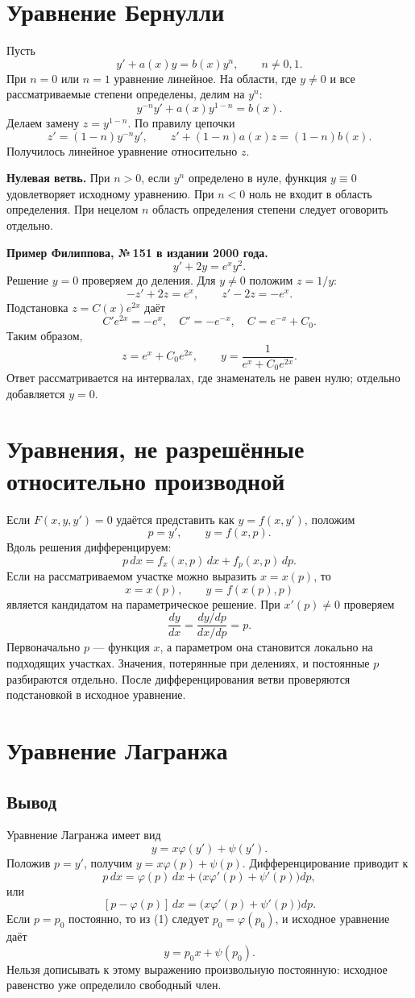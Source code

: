 \documentclass[12pt,a4paper]{article}
\begin{document}
\section{Уравнение Бернулли}
Пусть
\[
y'+a(x)y=b(x)y^n,\qquad n\ne0,1.
\]
При $n=0$ или $n=1$ уравнение линейное. На области, где $y\ne0$ и все рассматриваемые степени определены, делим на $y^n$:
\[
y^{-n}y'+a(x)y^{1-n}=b(x).
\]
Делаем замену $z=y^{1-n}$. По правилу цепочки
\[
z'=(1-n)y^{-n}y',\qquad
\boxed{z'+(1-n)a(x)z=(1-n)b(x).}
\]
Получилось линейное уравнение относительно $z$.

\textbf{Нулевая ветвь.} При $n>0$, если $y^n$ определено в нуле, функция $y\equiv0$ удовлетворяет исходному уравнению. При $n<0$ ноль не входит в область определения. При нецелом $n$ область определения степени следует оговорить отдельно.

\textbf{Пример Филиппова, №\,151 в издании 2000 года.}
\[
y'+2y=e^xy^2.
\]
Решение $y=0$ проверяем до деления. Для $y\ne0$ положим $z=1/y$:
\[
-z'+2z=e^x,\qquad z'-2z=-e^x.
\]
Подстановка $z=C(x)e^{2x}$ даёт
\[
C'e^{2x}=-e^x,\quad C'=-e^{-x},\quad
C=e^{-x}+C_0.
\]
Таким образом,
\[
z=e^x+C_0e^{2x},\qquad
y=\frac1{e^x+C_0e^{2x}}.
\]
Ответ рассматривается на интервалах, где знаменатель не равен нулю; отдельно добавляется $y=0$.

\section{Уравнения, не разрешённые относительно производной}
Если $F(x,y,y')=0$ удаётся представить как $y=f(x,y')$, положим
\[
p=y',\qquad y=f(x,p).
\]
Вдоль решения дифференцируем:
\[
p\,dx=f_x(x,p)\,dx+f_p(x,p)\,dp.
\]
Если на рассматриваемом участке можно выразить $x=x(p)$, то
\[
x=x(p),\qquad y=f(x(p),p)
\]
является кандидатом на параметрическое решение. При $x'(p)\ne0$ проверяем
\[
\frac{dy}{dx}=\frac{dy/dp}{dx/dp}=p.
\]
Первоначально $p$ — функция $x$, а параметром она становится локально на подходящих участках. Значения, потерянные при делениях, и постоянные $p$ разбираются отдельно. После дифференцирования ветви проверяются подстановкой в исходное уравнение.

\section{Уравнение Лагранжа}
\subsection{Вывод}
Уравнение Лагранжа имеет вид
\[
y=x\varphi(y')+\psi(y').
\]
Положив $p=y'$, получим $y=x\varphi(p)+\psi(p)$. Дифференцирование приводит к
\[
p\,dx=\varphi(p)\,dx+
\bigl(x\varphi'(p)+\psi'(p)\bigr)dp,
\]
или
\[
[p-\varphi(p)]\,dx
=\bigl(x\varphi'(p)+\psi'(p)\bigr)dp. \tag{1}
\]
Если $p=p_0$ постоянно, то из (1) следует $p_0=\varphi(p_0)$, и исходное уравнение даёт
\[
y=p_0x+\psi(p_0).
\]
Нельзя дописывать к этому выражению произвольную постоянную: исходное равенство уже определило свободный член.
\end{document}
